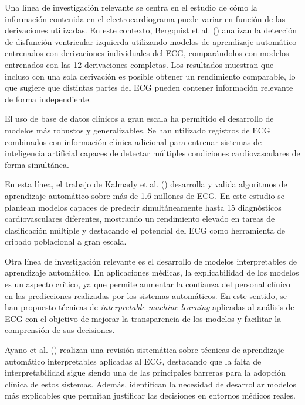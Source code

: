 \documentclass[12pt,a4paper,twoside]{book}
\begin{document}
Una línea de investigación relevante se centra en el estudio de cómo la información contenida en el electrocardiograma puede variar en función de las derivaciones utilizadas. 
En este contexto, Bergquist et al. (\cite{bergquist2023ecg_leads}) analizan la detección de disfunción ventricular izquierda utilizando modelos de aprendizaje automático entrenados con derivaciones individuales del ECG, comparándolos con modelos entrenados con las 12 derivaciones completas. 
Los resultados muestran que incluso con una sola derivación es posible obtener un rendimiento comparable, lo que sugiere que distintas partes del ECG pueden contener información relevante de forma independiente.

El uso de base de datos clínicos a gran escala ha permitido el desarrollo de modelos más robustos y generalizables. 
Se han utilizado registros de ECG combinados con información clínica adicional para entrenar sistemas de inteligencia artificial capaces de detectar múltiples condiciones cardiovasculares de forma simultánea.

En esta línea, el trabajo de Kalmady et al. (\cite{kalmady2024ecg_cv}) desarrolla y valida algoritmos de aprendizaje automático sobre más de 1.6 millones de ECG.
En este estudio se plantean modelos capaces de predecir simultáneamente hasta 15 diagnósticos cardiovasculares diferentes, mostrando un rendimiento elevado en tareas de clasificación múltiple y destacando el potencial del ECG como herramienta de cribado poblacional a gran escala.

Otra línea de investigación relevante es el desarrollo de modelos interpretables de aprendizaje automático. 
En aplicaciones médicas, la explicabilidad de los modelos es un aspecto crítico, ya que permite aumentar la confianza del personal clínico en las predicciones realizadas por los sistemas automáticos. 
En este sentido, se han propuesto técnicas de \textit{interpretable machine learning} aplicadas al análisis de ECG con el objetivo de mejorar la transparencia de los modelos y facilitar la comprensión de sus decisiones.

Ayano et al. (\cite{ayano2022ecg_ml_review}) realizan una revisión sistemática sobre técnicas de aprendizaje automático interpretables aplicadas al ECG, destacando que la falta de interpretabilidad sigue siendo una de las principales barreras para la adopción clínica de estos sistemas. 
Además, identifican la necesidad de desarrollar modelos más explicables que permitan justificar las decisiones en entornos médicos reales.
\end{document}
